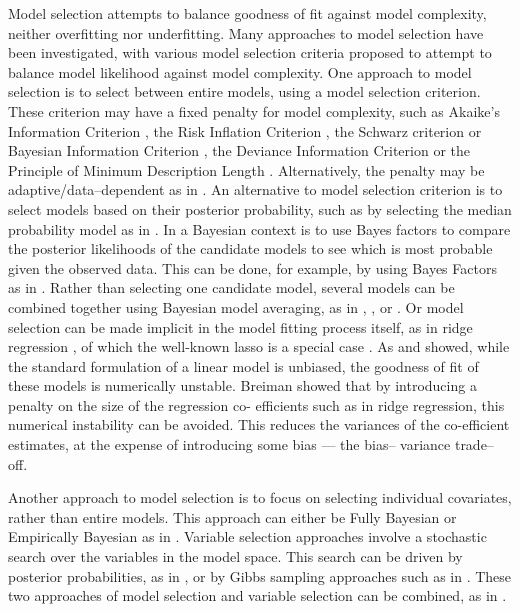 \documentclass{amsart}[12pt]
\begin{document}

Model selection attempts to balance goodness of fit against model complexity, neither overfitting nor
underfitting. Many approaches to model selection have been investigated, with various model selection criteria
proposed to attempt to balance model likelihood against model complexity. One approach to model selection is
to select between entire models, using a model selection criterion. These criterion may have a fixed penalty
for model complexity, such as Akaike's Information Criterion \cite{Akaike1974}, the Risk Inflation Criterion
\cite{Foster1994}, the Schwarz criterion or Bayesian Information Criterion \cite{Schwarz1978}, the Deviance
Information Criterion \cite{Spiegelhalter2016} or the Principle of Minimum Description Length
\cite{Hansen2001}. Alternatively, the penalty may be adaptive/data--dependent as in \cite{George2000}. An
alternative to model selection criterion is to select models based on their posterior probability, such as by
selecting the median probability model as in \cite{Barbieri2004}. In a Bayesian context is to use Bayes
factors to compare the posterior likelihoods of the candidate models to see which is most probable given the
observed data. This can be done, for example, by using Bayes Factors as in \cite{Kass1993}. Rather than
selecting one candidate model, several models can be combined together using Bayesian model  averaging, as in
\cite{Hoeting1999}, \cite{Raftery1997}, \cite{Fernandez2001} or \cite{Papaspiliopoulos2016}. Or model
selection can be made implicit in the model fitting process itself, as in ridge regression \cite{Casella1980},
of which the well-known lasso is a special case \cite{Tibshirani1996}. As \cite{Breiman1996} and
\cite{Efron2013} showed, while  the standard formulation of a linear model is unbiased, the goodness of fit of
these models is numerically  unstable. Breiman showed that by introducing a penalty on the size of the
regression co- efficients such as  in ridge regression, this numerical instability can be avoided. This
reduces the variances of the co-efficient estimates, at the expense of introducing some bias --- the bias--
variance trade--off.

Another approach to model selection is to focus on selecting individual covariates, rather than entire
models. This approach can either be Fully Bayesian or Empirically Bayesian as in \cite{Cui2008}. Variable
selection approaches involve a stochastic search over the variables in the model space. This search can be
driven by posterior probabilities, as in \cite{Casella2006}, or by Gibbs sampling approaches such as in
\cite{George1993}. These two approaches of model selection and variable selection can be combined, as in
\cite{Geweke1996}.
\end{document}
